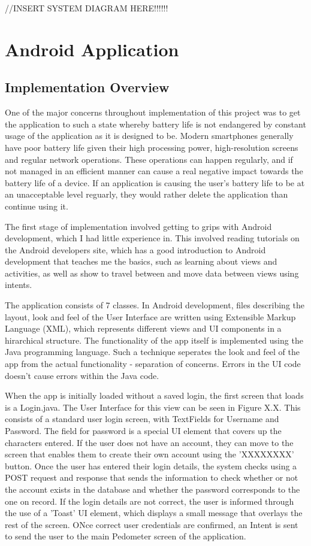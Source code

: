 \documentclass{l4proj}
\begin{document}
//INSERT SYSTEM DIAGRAM HERE!!!!!!

\section{Android Application}

\subsection{Implementation Overview}

One of the major concerns throughout implementation of this project was to get the application to such a state whereby battery life is not endangered by constant usage of the application as it is designed to be. Modern smartphones generally have poor battery life given their high processing power, high-resolution screens and regular network operations. These operations can happen regularly, and if not managed in an efficient manner can cause a real negative impact towards the battery life of a device. If an application is causing the user's battery life to be at an unacceptable level reguarly, they would rather delete the application than continue using it.

The first stage of implementation involved getting to grips with Android development, which I had little experience in. This involved reading tutorials on the Android developers site, which has a good introduction to Android development that teaches me the basics, such as learning about views and activities, as well as show to travel between and move data between views using intents.

The application consists of 7 classes. In Android development, files describing the layout, look and feel of the User Interface are written using Extensible Markup Language (XML), which represents different views and UI components in a hirarchical structure. The functionality of the app itself is implemented using the Java programming language. Such a technique seperates the look and feel of the app from the actual functionality - separation of concerns. Errors in the UI code doesn't cause errors within the Java code.

When the app is initially loaded without a saved login, the first screen that loads is a Login.java. The User Interface for this view can be seen in Figure X.X. This consists of a standard user login screen, with TextFields for Username and Password. The field for password is a special UI element that covers up the characters entered. If the user does not have an account, they can move to the screen that enables them to create their own account using the 'XXXXXXXX' button. Once the user has entered their login details, the system checks using a POST request and response that sends the information to check whether or not the account exists in the database and whether the password corresponds to the one on record. If the login details are not correct, the user is informed through the use of a 'Toast' UI element, which displays a small message that overlays the rest of the screen. ONce correct user credentials are confirmed, an Intent is sent to send the user to the main Pedometer screen of the application.
\end{document}
